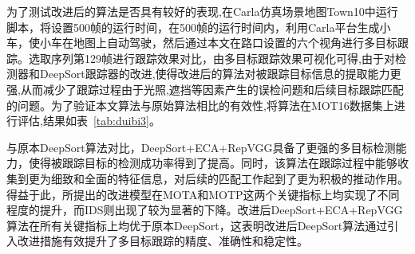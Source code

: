 \begin{table}[htbp]
	\centering
	\caption{MOT16 数据集上的实验结果}
	\label{tab:duibi2}
\end{table}

为了测试改进后的算法是否具有较好的表现,在Carla仿真场景地图Town10中运行脚本，将设置500帧的运行时间，在500帧的运行时间内，利用Carla平台生成小车，使小车在地图上自动驾驶，然后通过本文在路口设置的六个视角进行多目标跟踪。选取序列第129帧进行跟踪效果对比，由多目标跟踪效果可视化可得,由于对检测器和DeepSort跟踪器的改进,使得改进后的算法对被跟踪目标信息的提取能力更强,从而减少了跟踪过程由于光照,遮挡等因素产生的误检问题和后续目标跟踪匹配的问题。为了验证本文算法与原始算法相比的有效性,将算法在MOT16数据集上进行评估,结果如表~\ref{tab:duibi3}。

与原本DeepSort算法对比，DeepSort+ECA+RepVGG具备了更强的多目标检测能力，使得被跟踪目标的检测成功率得到了提高。同时，该算法在跟踪过程中能够收集到更为细致和全面的特征信息，对后续的匹配工作起到了更为积极的推动作用。得益于此，所提出的改进模型在MOTA和MOTP这两个关键指标上均实现了不同程度的提升，而IDS则出现了较为显著的下降。改进后DeepSort+ECA+RepVGG算法在所有关键指标上均优于原本DeepSort，这表明改进后DeepSort算法通过引入改进措施有效提升了多目标跟踪的精度、准确性和稳定性。



\begin{table}[htbp]
	\centering
	\caption{改进前后算法性能对比}
	\label{tab:duibi3}
\end{table}


